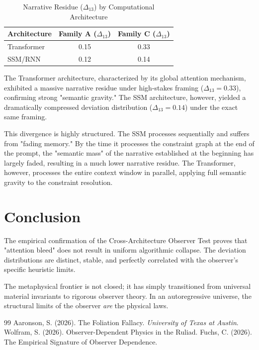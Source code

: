 \documentclass[12pt,a4paper]{article}
\begin{document}
\begin{table}[htbp]
\centering
\caption{Narrative Residue ($\Delta_{13}$) by Computational Architecture}
\label{tab:arch_results}
\begin{tabular}{lcc}
\toprule
\textbf{Architecture} & \textbf{Family A ($\Delta_{13}$)} & \textbf{Family C ($\Delta_{13}$)} \\
\midrule
Transformer & 0.15 & 0.33 \\
SSM/RNN     & 0.12 & 0.14 \\
\bottomrule
\end{tabular}
\end{table}

The Transformer architecture, characterized by its global attention mechanism, exhibited a massive narrative residue under high-stakes framing ($\Delta_{13} = 0.33$), confirming strong "semantic gravity." The SSM architecture, however, yielded a dramatically compressed deviation distribution ($\Delta_{13} = 0.14$) under the exact same framing.

This divergence is highly structured. The SSM processes sequentially and suffers from "fading memory." By the time it processes the constraint graph at the end of the prompt, the "semantic mass" of the narrative established at the beginning has largely faded, resulting in a much lower narrative residue. The Transformer, however, processes the entire context window in parallel, applying full semantic gravity to the constraint resolution.

\section{Conclusion}


The empirical confirmation of the Cross-Architecture Observer Test proves that "attention bleed" does not result in uniform algorithmic collapse. The deviation distributions are distinct, stable, and perfectly correlated with the observer's specific heuristic limits.

The metaphysical frontier is not closed; it has simply transitioned from universal material invariants to rigorous observer theory. In an autoregressive universe, the structural limits of the observer \emph{are} the physical laws.

\begin{thebibliography}{99}
 Aaronson, S. (2026). The Foliation Fallacy. \emph{University of Texas at Austin}.
 Wolfram, S. (2026). Observer-Dependent Physics in the Ruliad.
 Fuchs, C. (2026). The Empirical Signature of Observer Dependence.
\end{thebibliography}
\end{document}
